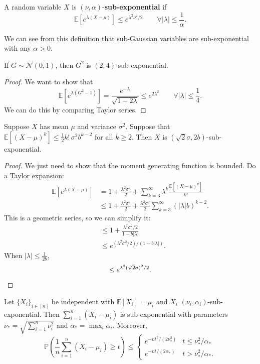 \begin{defn}
A random variable $X$ is $(\nu, \alpha)$-\textbf{sub-exponential} if
\[
\mathbb{E}[e^{\lambda(X - \mu)}] \leq e^{\lambda^2 \nu^2 / 2} \qquad \forall |\lambda| \leq \frac{1}{\alpha}.
\]
\end{defn}

We can see from this definition that sub-Gaussian variables are sub-exponential with any $\alpha > 0$.

\begin{exam}
If $G \sim \mathcal{N}(0, 1)$, then $G^2$ is $(2, 4)$-sub-exponential.
\end{exam}

\begin{proof}
We want to show that
\[
\mathbb{E}[e^{\lambda(G^2 - 1)}] = \frac{e^{-\lambda}}{\sqrt{1 - 2\lambda}} \leq e^{2\lambda^2} \qquad \forall |\lambda| \leq \frac{1}{4}.
\]
We can do this by comparing Taylor series.
\end{proof}

\begin{prop}
Suppose $X$ has mean $\mu$ and variance $\sigma^2$. Suppose that $\mathbb{E}[(X - \mu)^k] \leq \tfrac{1}{2} k! \, \sigma^2 b^{k-2}$ for all $k \geq 2$. Then $X$ is $(\sqrt{2}\sigma, 2b)$-sub-exponential.
\end{prop}

\begin{proof}
We just need to show that the moment generating function is bounded. Do a Taylor expansion:
\begin{align*}
\mathbb{E}[e^{\lambda(X-\mu)}] 
&= 1 + \frac{\lambda^2 \sigma^2}{2} + \sum_{k=3}^{\infty} \lambda^k \frac{\mathbb{E}[(X-\mu)^k]}{k!} \\
&\leq 1 + \frac{\lambda^2 \sigma^2}{2} + \frac{\lambda^2 \sigma^2}{2} \sum_{k=3}^{\infty} (|\lambda| b)^{k-2}.
\end{align*}
This is a geometric series, so we can simplify it:
\begin{align*}
&\leq 1 + \frac{\lambda^2 \sigma^2 / 2}{1 - b|\lambda|} \\
&\leq e^{(\lambda^2 \sigma^2 / 2) / (1 - b|\lambda|)}.
\end{align*}
When $|\lambda| \leq \tfrac{1}{2b}$,
\[
\leq e^{\lambda^2 (\sqrt{2}\sigma)^2 / 2}. \qedhere
\]
\end{proof}

\begin{lem}
Let $\{X_i\}_{i \in [n]}$ be independent with $\mathbb{E}[X_i] = \mu_i$ and $X_i$ $(\nu_i, \alpha_i)$-sub-exponential. Then $\sum_{i=1}^n (X_i - \mu_i)$ is sub-exponential with parameters $\nu_* = \sqrt{\sum_{i=1}^n \nu_i^2}$ and $\alpha_* = \max_i \alpha_i$. Moreover,
\[
\mathbb{P}\!\left( \frac{1}{n} \sum_{i=1}^n (X_i - \mu_i) \geq t \right) \leq 
\begin{cases} 
e^{-n t^2 / (2 \nu_*^2)} & t \leq \nu_*^2 / \alpha_* \\
e^{-n t / (2 \alpha_*)} & t > \nu_*^2 / \alpha_*.
\end{cases}
\]
\end{lem}

